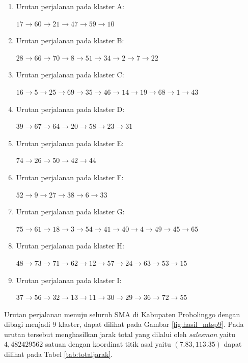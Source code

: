 \begin{enumerate}
\item Urutan perjalanan pada klaster A:

$17\rightarrow60\rightarrow21\rightarrow47\rightarrow59\rightarrow10$

\item Urutan perjalanan pada klaster B:

$28\rightarrow66\rightarrow70\rightarrow8\rightarrow51\rightarrow34\rightarrow2\rightarrow7\rightarrow22$

\item Urutan perjalanan pada klaster C:

$16\rightarrow5\rightarrow25\rightarrow69\rightarrow35\rightarrow46\rightarrow14\rightarrow19\rightarrow68\rightarrow1\rightarrow43$

\item Urutan perjalanan pada klaster D:

$39\rightarrow67\rightarrow64\rightarrow20\rightarrow58\rightarrow23\rightarrow31$

\item Urutan perjalanan pada klaster E:

$74\rightarrow26\rightarrow50\rightarrow42\rightarrow44$

\item Urutan perjalanan pada klaster F:

$52\rightarrow9\rightarrow27\rightarrow38\rightarrow6\rightarrow33$

\item Urutan perjalanan pada klaster G:

$75\rightarrow61\rightarrow18\rightarrow3\rightarrow54\rightarrow41\rightarrow40\rightarrow4\rightarrow49\rightarrow45\rightarrow65$

\item Urutan perjalanan pada klaster H:

$48\rightarrow73\rightarrow71\rightarrow62\rightarrow12\rightarrow57\rightarrow24\rightarrow63\rightarrow53\rightarrow15$

\item Urutan perjalanan pada klaster I:

$37\rightarrow56\rightarrow32\rightarrow13\rightarrow11\rightarrow30\rightarrow29\rightarrow36\rightarrow72\rightarrow55$

\end{enumerate}

Urutan perjalanan menuju seluruh SMA di Kabupaten Probolinggo dengan dibagi menjadi 9 klaster, dapat dilihat pada Gambar \ref{fig:hasil_mtsp9}. Pada urutan tersebut menghasilkan jarak total yang dilalui oleh \textit{salesman} yaitu $4,482429562$ satuan dengan koordinat titik asal yaitu $(7.83, 113.35)$ dapat dilihat pada Tabel \ref{tab:totaljarak}.

